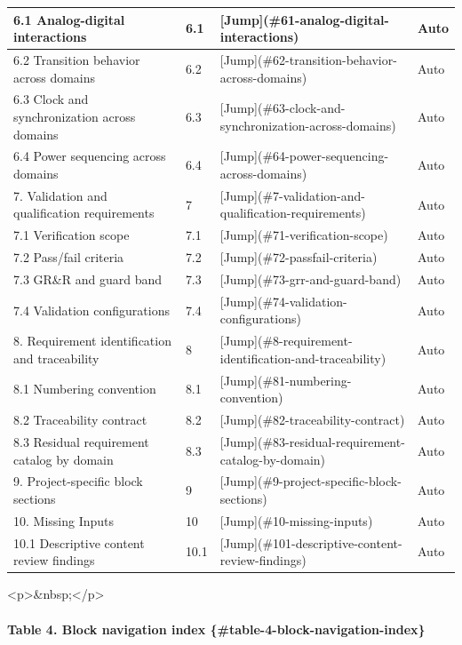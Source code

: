 \documentclass[11pt]{article}
\begin{document}
\begin{longtable}{|p{}|p{}|p{}|p{}|}
\hline
6.1 Analog-digital interactions & 6.1 & [Jump](\#61-analog-digital-interactions) & Auto \\
\hline
6.2 Transition behavior across domains & 6.2 & [Jump](\#62-transition-behavior-across-domains) & Auto \\
\hline
6.3 Clock and synchronization across domains & 6.3 & [Jump](\#63-clock-and-synchronization-across-domains) & Auto \\
\hline
6.4 Power sequencing across domains & 6.4 & [Jump](\#64-power-sequencing-across-domains) & Auto \\
\hline
7. Validation and qualification requirements & 7 & [Jump](\#7-validation-and-qualification-requirements) & Auto \\
\hline
7.1 Verification scope & 7.1 & [Jump](\#71-verification-scope) & Auto \\
\hline
7.2 Pass/fail criteria & 7.2 & [Jump](\#72-passfail-criteria) & Auto \\
\hline
7.3 GR\&R and guard band & 7.3 & [Jump](\#73-grr-and-guard-band) & Auto \\
\hline
7.4 Validation configurations & 7.4 & [Jump](\#74-validation-configurations) & Auto \\
\hline
8. Requirement identification and traceability & 8 & [Jump](\#8-requirement-identification-and-traceability) & Auto \\
\hline
8.1 Numbering convention & 8.1 & [Jump](\#81-numbering-convention) & Auto \\
\hline
8.2 Traceability contract & 8.2 & [Jump](\#82-traceability-contract) & Auto \\
\hline
8.3 Residual requirement catalog by domain & 8.3 & [Jump](\#83-residual-requirement-catalog-by-domain) & Auto \\
\hline
9. Project-specific block sections & 9 & [Jump](\#9-project-specific-block-sections) & Auto \\
\hline
10. Missing Inputs & 10 & [Jump](\#10-missing-inputs) & Auto \\
\hline
10.1 Descriptive content review findings & 10.1 & [Jump](\#101-descriptive-content-review-findings) & Auto \\
\hline
\end{longtable}


<p>\&nbsp;</p>

\paragraph{Table 4. Block navigation index \{\#table-4-block-navigation-index\}}
\end{document}
